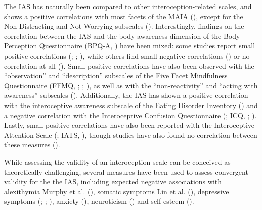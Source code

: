 \documentclass[
  man,
  floatsintext,
  longtable,
  nolmodern,
  notxfonts,
  notimes,
  colorlinks=true,linkcolor=blue,citecolor=blue,urlcolor=blue]{apa7}
\begin{document}
The IAS has naturally been compared to other interoception-related
scales, and shows a positive correlations with most facets of the MAIA
(),
except for the Non-Distracting and Not-Worrying subscales
(). Interestingly, findings
on the correlation between the IAS and the body awareness dimension of
the Body Perception Questionnaire (BPQ-A,
) have been mixed: some
studies report small positive correlations
(;
;
), while others find
small negative correlations ()
or no correlation at all (). Small positive correlations have also been observed with the
``observation'' and ``description'' subscales of the Five Facet
Mindfulness Questionnaire (FFMQ, ; ;
), as well as with the
``non-reactivity'' and ``acting with awareness'' subscales
(). Additionally, the IAS
has shown a positive correlation with the interoceptive awareness
subscale of the Eating Disorder Inventory () and a negative correlation with the Interoceptive Confusion
Questionnaire (; ICQ,
;
). Lastly, small positive
correlations have also been reported with the Interoceptive Attention
Scale (; IATS,
), though studies have also
found no correlation between these measures
().

While assessing the validity of an interoception scale can be conceived
as theoretically challenging, several measures have been used to assess
convergent validity for the the IAS, including expected negative
associations with alexithymia Murphy et al.
(), somatic symptoms Lin et al.
(), depressive symptoms
(;
;
), anxiety
(), neuroticism
() and self-esteem
().
\end{document}
